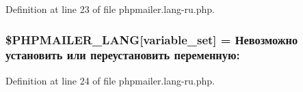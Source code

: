 Definition at line 23 of file phpmailer.\+lang-\/ru.\+php.

\subsubsection[{\texorpdfstring{\$\+P\+H\+P\+M\+A\+I\+L\+E\+R\+\_\+\+L\+A\+NG}{$PHPMAILER_LANG}}]{\setlength{\rightskip}{0pt plus 5cm}\$P\+H\+P\+M\+A\+I\+L\+E\+R\+\_\+\+L\+A\+NG\mbox{[}\textquotesingle{}variable\+\_\+set\textquotesingle{}\mbox{]} = \textquotesingle{}Невозможно установить или переустановить переменную\+: \textquotesingle{}}\hypertarget{phpmailer_8lang-ru_8php_af795debc7a739d038742691c358d9032}{}\label{phpmailer_8lang-ru_8php_af795debc7a739d038742691c358d9032}


Definition at line 24 of file phpmailer.\+lang-\/ru.\+php.

